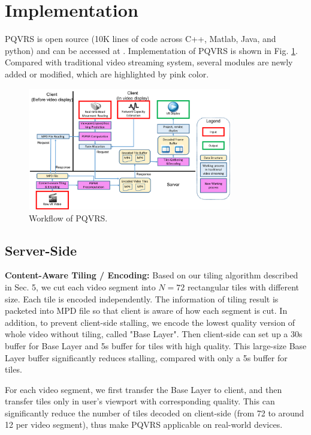 \section{Implementation}

PQVRS is open source (10K lines of code across C++, Matlab, Java, and python) and can be accessed at \cite{github}. Implementation of PQVRS is shown in Fig. \ref{implementation}. Compared with traditional video streaming system, several modules are newly added or modified, which are highlighted by pink color.

\begin{figure}
  \centering
  \includegraphics[width=3.5in]{images/implementation.pdf}
  \caption{Workflow of PQVRS.}
  \label{implementation}
  \end{figure}

\subsection{Server-Side}

\textbf{Content-Aware Tiling / Encoding:} Based on our tiling algorithm described in Sec. 5, we cut each video segment into $N = 72$ rectangular tiles with different size. Each tile is encoded independently. The information of tiling result is packeted into MPD file so that client is aware of how each segment is cut. In addition, to prevent client-side stalling, we encode the lowest quality version of whole video without tiling, called "Base Layer".\cite{buffer} Then client-side can set up a 30s buffer for Base Layer and 5s buffer for tiles with high quality. \cite{buffer} This large-size Base Layer buffer significantly reduces stalling, compared with only a 5s buffer for tiles.

For each video segment, we first transfer the Base Layer to client, and then transfer tiles only in user's viewport with corresponding quality. This can significantly reduce the number of tiles decoded on client-side (from 72 to around 12 per video segment), thus make PQVRS applicable on real-world devices.

